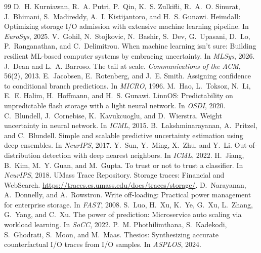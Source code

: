 \documentclass[10pt,twocolumn]{article}
\begin{document}
{\footnotesize
\begin{thebibliography}{99}
\setlength{\itemsep}{0pt}\setlength{\parskip}{0pt}
 D.~H. Kurniawan, R.~A. Putri, P.~Qin, K.~S. Zulkifli, R.~A.~O. Sinurat, J.~Bhimani, S.~Madireddy, A.~I. Kistijantoro, and H.~S. Gunawi. Heimdall: Optimizing storage I/O admission with extensive machine learning pipeline. In \emph{EuroSys}, 2025.
 V.~Gohil, N.~Stojkovic, N.~Bashir, S.~Dev, G.~Upasani, D.~Lo, P.~Ranganathan, and C.~Delimitrou. When machine learning isn't sure: Building resilient ML-based computer systems by embracing uncertainty. In \emph{MLSys}, 2026.
 J.~Dean and L.~A. Barroso. The tail at scale. \emph{Communications of the ACM}, 56(2), 2013.
 E.~Jacobsen, E.~Rotenberg, and J.~E. Smith. Assigning confidence to conditional branch predictions. In \emph{MICRO}, 1996.
 M.~Hao, L.~Toksoz, N.~Li, E.~E. Halim, H.~Hoffmann, and H.~S. Gunawi. LinnOS: Predictability on unpredictable flash storage with a light neural network. In \emph{OSDI}, 2020.
 C.~Blundell, J.~Cornebise, K.~Kavukcuoglu, and D.~Wierstra. Weight uncertainty in neural network. In \emph{ICML}, 2015.
 B.~Lakshminarayanan, A.~Pritzel, and C.~Blundell. Simple and scalable predictive uncertainty estimation using deep ensembles. In \emph{NeurIPS}, 2017.
 Y.~Sun, Y.~Ming, X.~Zhu, and Y.~Li. Out-of-distribution detection with deep nearest neighbors. In \emph{ICML}, 2022.
 H.~Jiang, B.~Kim, M.~Y. Guan, and M.~Gupta. To trust or not to trust a classifier. In \emph{NeurIPS}, 2018.
 UMass Trace Repository. Storage traces: Financial and WebSearch. \url{https://traces.cs.umass.edu/docs/traces/storage/}.
 D.~Narayanan, A.~Donnelly, and A.~Rowstron. Write off-loading: Practical power management for enterprise storage. In \emph{FAST}, 2008.
 S.~Luo, H.~Xu, K.~Ye, G.~Xu, L.~Zhang, G.~Yang, and C.~Xu. The power of prediction: Microservice auto scaling via workload learning. In \emph{SoCC}, 2022.
 P.~M. Phothilimthana, S.~Kadekodi, S.~Ghodrati, S.~Moon, and M.~Maas. Thesios: Synthesizing accurate counterfactual I/O traces from I/O samples. In \emph{ASPLOS}, 2024.
\end{thebibliography}
}
\end{document}
